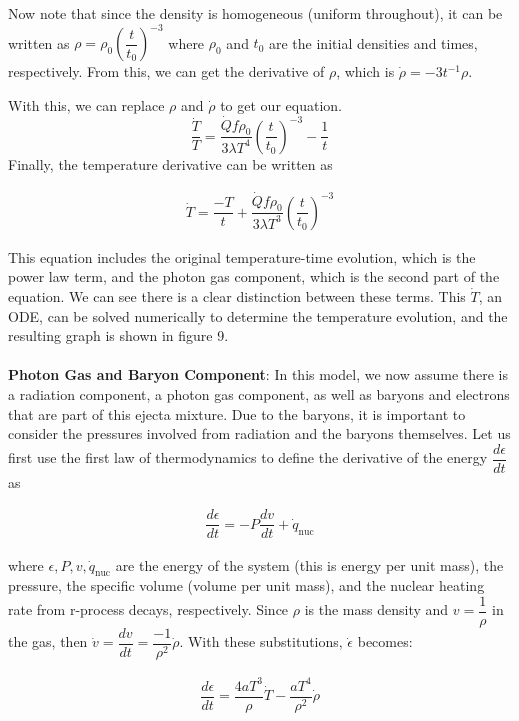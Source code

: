 \documentclass[11pt,a4paper]{article}
\begin{document}
Now note that since the density is homogeneous (uniform throughout), it can be written as $ \rho = \rho_0 \left(\dfrac{t}{t_0} \right)^{-3} $ where $\rho_0$ and $t_0$ are the initial densities and times, respectively. From this, we can get the derivative of $\rho$, which is $ \dot{\rho} = -3t^{-1} \rho $. 

With this, we can replace $\rho$ and $\dot{\rho}$ to get our equation.
$$ \dfrac{\dot{T}}{T} = \dfrac{\dot{Q} f \rho_0}{3 \lambda T^4} \left( \dfrac{t}{t_0} \right) ^{-3} - \dfrac{1}{t} $$ Finally, the temperature derivative can be written as 

\begin{align}
	\dot{T} = \dfrac{-T}{t} + \dfrac{\dot{Q} f \rho_0}{3 \lambda T^3} 	\left( \dfrac{t}{t_0} \right) ^{-3} 
\end{align}

This equation includes the original temperature-time evolution, which is the power law term, and the photon gas component, which is the second part of the equation. We can see there is a clear distinction between these terms.  This 
$\dot{T}$, an ODE, can be solved numerically to determine the temperature evolution, and the resulting graph is shown in figure 9.
\\\\

\textbf{Photon Gas and Baryon Component}: In this model, we now assume there is a radiation component, a photon gas component, as well as baryons and electrons that are part of this ejecta mixture. Due to the baryons, it is important to consider the pressures involved from radiation and the baryons themselves. Let us first use the first law of thermodynamics to define the derivative of the energy $\dfrac{d \epsilon}{dt}$ as

\begin{align}
	\dfrac{d \epsilon}{dt} = -P \dfrac{dv}{dt} + \dot{q}_\mathrm{nuc}
\end{align}

where $\epsilon, P, v, \dot{q}_\mathrm{nuc}$ are the energy of the system (this is energy per unit mass), the pressure, the specific volume (volume per unit mass), and the nuclear heating rate from r-process decays, respectively. Since $\rho$ is the mass density and $ v = \dfrac{1}{\rho} $ in the gas, then $ \dot{v} = \dfrac{dv}{dt} =  \dfrac{-1}{\rho ^2}\dot{\rho} $. With these substitutions, $\dot{\epsilon}$ becomes: 

\begin{align}
	\dfrac{d \epsilon}{dt} = \dfrac{4a T^3}{\rho} \dot{T} - 			\dfrac{a T^4}{\rho^2}\dot{\rho} 
\end{align}
\end{document}
